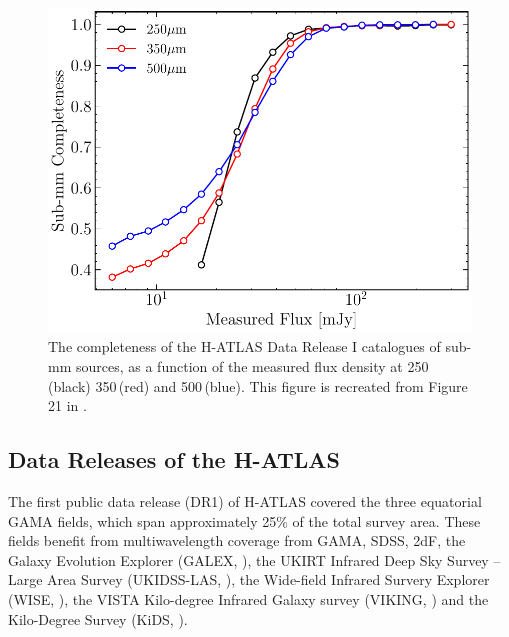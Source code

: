 \begin{figure}
    \centering
	\includegraphics[width=0.75\columnwidth]{Figures/submm_completeness.pdf}
	\caption{The completeness of the H-ATLAS Data Release I catalogues of sub-mm sources, as a function of the measured flux density at 250\,\micron (black) 350\,\micron (red) and 500\,\micron (blue). This figure is recreated from Figure 21 in \citealt{Valiante_2016}.}
	\label{fig:submm_completeness}
\end{figure}

\subsection{Data Releases of the H-ATLAS}
\label{sec:Data Releases of the H-ATLAS}

The first public data release (DR1) of H-ATLAS covered the three equatorial GAMA fields, which span approximately 25\% of the total survey area. These fields benefit from multiwavelength coverage from GAMA, SDSS, 2dF, the Galaxy Evolution Explorer (GALEX, \citealt{Martin_2005}), the UKIRT Infrared Deep Sky Survey -- Large Area Survey (UKIDSS-LAS, \citealt{Lawrence_2007}), the Wide-field Infrared Survery Explorer (WISE, \citealt{Wright_2010}), the VISTA Kilo-degree Infrared Galaxy survey (VIKING, \citealt{Edge_2013}) and the Kilo-Degree Survey (KiDS, \citealt{deJong_2013}). 

